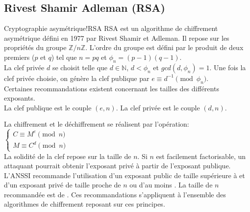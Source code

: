 \subsection{Rivest Shamir Adleman (RSA)}
\begin{Define}{Cryptographie asymétrique!RSA}
\gls{RSA} est un algorithme de chiffrement asymétrique défini en 1977 par Rivest Shamir et Adleman. Il repose sur les propriétés du groupe $\mathbb{Z}/n\mathbb{Z}$. L'ordre du groupe est défini par le produit de deux premiers ($p$ et $q$) tel que $n=pq$ et $\phi_n=(p-1)(q-1)$.\\
La clef privée $d$ se choisit telle que $d \in \mathbb{N}$, $d<\phi_n$ et $gcd(d,\phi_n)=1$. Une fois la clef privée choisie, on génère la clef publique par $e\equiv d^{-1} \pmod{\phi_n}$.\\
Certaines recommandations existent concernant les tailles des différents exposants.\\
La clef publique est le couple $(e,n)$. La clef privée est le couple $(d,n)$.
\end{Define}
La chiffrement et le déchiffrement se réalisent par l'opération:\\
$\left\{
\begin{array}{l}
  C \equiv M^e \pmod n\\
  M \equiv C^d \pmod n
\end{array}
\right.$\\
La solidité de la clef repose sur la taille de $n$. Si $n$ est facilement factorisable, un attaquant pourrait obtenir l'exposant privé à partir de l'exposant publique.\\
L'\gls{ANSSI} recommande l'utilisation d'un exposant public de taille supérieure à \ZnZeAnssi et d'un exposant privé de taille proche de $n$ ou d'au moins \ZnZdAnssi. La taille de $n$ recommandée est de \ZnZnAnssi. Ces recommandations s'appliquent à l'ensemble des algorithmes de chiffrement reposant sur ces principes.\\

